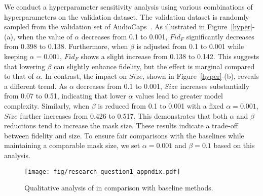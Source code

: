 We conduct a hyperparameter sensitivity analysis using various combinations of hyperparameters on the validation dataset. The validation dataset is randomly sampled from the validation set of AudioCaps~\cite{kim2019audiocaps}. As illustrated in Figure~\ref{hyper}-(a), when the value of $\alpha$ decreases from 0.1 to 0.001, $Fid_{F}$ significantly decreases from 0.398 to 0.138. Furthermore, when $\beta$ is adjusted from 0.1 to 0.001 while keeping $\alpha = 0.001$, $Fid_{F}$ shows a slight increase from 0.138 to 0.142. This suggests that lowering $\beta$ can slightly enhance fidelity, but the effect is marginal compared to that of $\alpha$. In contrast, the impact on $Size$, shown in Figure~\ref{hyper}-(b), reveals a different trend. As $\alpha$ decreases from 0.1 to 0.001, $Size$ increases substantially from 0.07 to 0.51, indicating that lower $\alpha$ values lead to greater model complexity. Similarly, when $\beta$ is reduced from 0.1 to 0.001 with a fixed $\alpha = 0.001$, $Size$ further increases from 0.426 to 0.517. This demonstrates that both $\alpha$ and $\beta$ reductions tend to increase the mask size. These results indicate a trade-off between fidelity and size. To ensure fair comparisons with the baselines while maintaining a comparable mask size, we set $\alpha = 0.001$ and $\beta = 0.1$ based on this analysis.

\begin{figure*}
    \center
    \texttt{[image: fig/research\_question1\_appndix.pdf]}
    \caption{Qualitative analysis of \mname{} in comparison with baseline methods.}
    \label{experiment_appendix}
\end{figure*}

